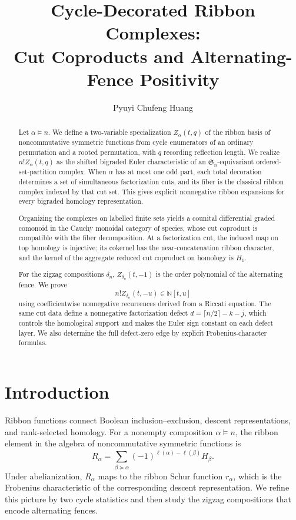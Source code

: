\documentclass{amsart}
\title[Cycle-Decorated Ribbon Complexes]
{Cycle-Decorated Ribbon Complexes:\\
Cut Coproducts and Alternating-Fence Positivity}
\author{Pyuyi Chufeng Huang}
\date{}
\theoremstyle{definition}
\theoremstyle{remark}
\begin{document}
\raggedbottom

\begin{abstract}
Let $\alpha\models n$.  We define a two-variable specialization
$Z_\alpha(t,q)$ of the ribbon basis of noncommutative symmetric functions
from cycle enumerators of an ordinary permutation and a rooted permutation,
with $q$ recording reflection length.  We realize $n!Z_\alpha(t,q)$ as the
shifted bigraded Euler characteristic of an $\mathfrak S_n$-equivariant
ordered-set-partition complex.  When $\alpha$ has at most one odd part,
each total decoration determines a set of simultaneous factorization cuts,
and its fiber is the classical ribbon complex indexed by that cut set.  This
gives explicit nonnegative ribbon expansions for every bigraded homology
representation.

Organizing the complexes on labelled finite sets yields a counital differential
graded comonoid in the Cauchy monoidal category of species, whose cut
coproduct is compatible with the fiber decomposition.  At a factorization
cut, the induced map on top homology is injective; its cokernel has the
near-concatenation ribbon character, and the kernel of the aggregate reduced
cut coproduct on homology is $H_1$.

For the zigzag compositions $\delta_n$, $Z_{\delta_n}(t,-1)$ is the order
polynomial of the alternating fence.  We prove
\[
 n!Z_{\delta_n}(t,-u)\in\mathbb N[t,u]
\]
using coefficientwise nonnegative recurrences derived from a Riccati
equation.  The same cut data define a nonnegative factorization defect
$d=\lceil n/2\rceil-k-j$, which controls the homological support and makes
the Euler sign constant on each defect layer.  We also determine the full
defect-zero edge by explicit Frobenius-character formulas.
\end{abstract}

\maketitle

\section{Introduction}
\label{sec:introduction}

Ribbon functions connect Boolean inclusion--exclusion, descent
representations, and rank-selected homology.  For a nonempty composition
$\alpha\models n$, the ribbon element in the algebra of noncommutative
symmetric functions is
\[
 R_\alpha=\sum_{\beta\succeq\alpha}
 (-1)^{\ell(\alpha)-\ell(\beta)}H_\beta.
\]
Under abelianization, $R_\alpha$ maps to the ribbon Schur function
$r_\alpha$, which is the Frobenius characteristic of the corresponding
descent representation.  We refine this picture by two cycle statistics and
then study the zigzag compositions that encode alternating fences.
\end{document}
